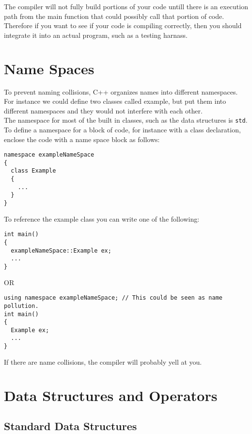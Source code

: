 \documentclass[12pt, letterpaper]{article}
\begin{document}
The compiler will not fully build portions of your code untill there is an execution path from the main function that could possibly call that portion of code. Therefore if you want to see if your code is compiling correctly, then you should integrate it into an actual program, such as a testing harnass.

\section{Name Spaces}

To prevent naming collisions, C++ organizes names into different namespaces. For instance we could define two classes called example, but put them into different namespaces and they would not interfere with each other.\\

The namespace for most of the built in classes, such as the data structures is \texttt{std}.\\

To define a namespace for a block of code, for instance with a class declaration, enclose the code with a name space block as follows:
\begin{verbatim}
namespace exampleNameSpace
{
  class Example
  {
    ...
  }
}
\end{verbatim}

To reference the example class you can write one of the following:

\begin{verbatim}
int main()
{
  exampleNameSpace::Example ex;
  ...
}
\end{verbatim}

OR

\begin{verbatim}
using namespace exampleNameSpace; // This could be seen as name pollution.
int main()
{
  Example ex;
  ...
}
\end{verbatim}

If there are name collisions, the compiler will probably yell at you.

\section{Data Structures and Operators}

\subsection{Standard Data Structures}
\end{document}
